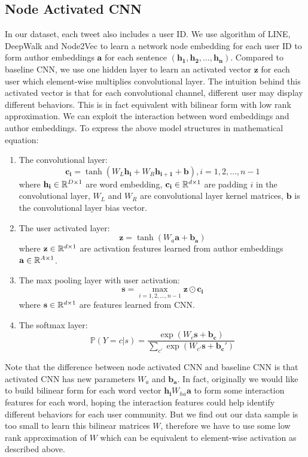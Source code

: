 \subsection*{Node Activated CNN}
In our dataset, each tweet also includes a user ID. We use algorithm of LINE, DeepWalk and Node2Vec to learn a network node embedding for each user ID to form author embeddings $\mathbf{a}$ for each sentence $(\mathbf{h_1},\mathbf{h_2},\ldots,\mathbf{h_n})$. Compared to baseline CNN, we use one hidden layer to learn an activated vector $\mathbf{z}$ for each user which element-wise multiplies convolutional layer. The intuition behind this activated vector is that for each convolutional channel, different user may display different behaviors. This is in fact equivalent with bilinear form with low rank approximation. We can exploit the interaction between word embeddings and author embeddings. To express the above model structures in mathematical equation:
\begin{enumerate}
	\item The convolutional layer:
\begin{equation}
	\mathbf{c_i} = \tanh(W_L\mathbf{h_i} + W_R \mathbf{h_{i+1}} + \mathbf{b}), i=1,2,\ldots,n-1
\end{equation}
where $\mathbf{h_i}\in \mathbb{R}^{D\times1}$ are word embedding, $\mathbf{c_i} \in \mathbb{R}^{d\times1}$ are padding $i$ in the convolutional layer, $W_L$ and $W_R$ are convolutional layer kernel matrices, $\mathbf{b}$ is the convolutional layer bias vector.
\item The user activated layer:
\begin{equation}
	\mathbf{z} = \tanh(W_a\mathbf{a}  + \mathbf{b_a})
\end{equation}
where $\mathbf{z} \in \mathbb{R}^{d \times 1}$ are activation features learned from author embeddings $\mathbf{a} \in \mathbb{R}^{A\times1}$.
\item The max pooling layer with user activation:
\begin{equation}
	\mathbf{s} = \max_{i=1,2,\ldots,n-1}\mathbf{z}\odot\mathbf{c_i}
\end{equation}
where $\mathbf{s} \in \mathbb{R}^{d \times 1}$ are features learned from CNN.
\item The softmax layer:
\begin{equation}
	\mathbb{P}(Y=c|s)=\frac{\exp(W_{c}\mathbf{s}+\mathbf{b_c})}{\sum_{c'}\exp(W_{c'}\mathbf{s}+\mathbf{b_c'})}
\end{equation}
\end{enumerate}
Note that the difference between node activated CNN and baseline CNN is that activated CNN has new parameters $W_a$ and $\mathbf{b_a}$. In fact, originally we would like to build bilinear form for each word vector $\mathbf{h_i} W_{ha} \mathbf{a}$ to form some interaction features for each word, hoping the interaction features could help identify different behaviors for each user community. But we find out our data sample is too small to learn this bilinear matrices $W$, therefore we have to use some low rank approximation of $W$ which can be equivalent to element-wise activation as described above.

